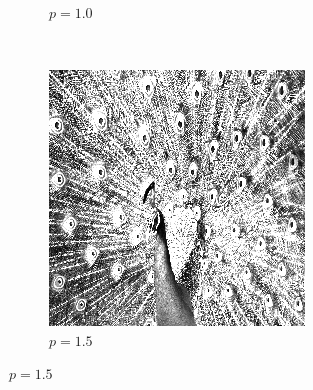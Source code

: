 \documentclass{article}
\begin{document}
\begin{enumerate}[label=(\alph*)]
\begin{figure}[!htb]
\begin{subfigure}[b]{0.3\textwidth}
            \caption{$p = 1.0$}
        \end{subfigure}
        ~
        \begin{subfigure}[b]{0.3\textwidth}
            \includegraphics[width=\textwidth]{img/PL15.png}
            \caption{$p = 1.5$}
        \end{subfigure}
        
        

\end{figure}
\end{enumerate}
\end{document}
